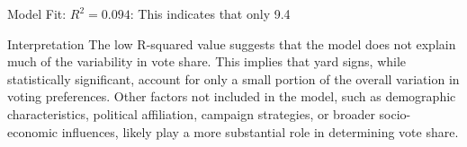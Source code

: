 \documentclass[12pt,letterpaper]{article}
\begin{document}
\begin{enumerate}
	Model Fit:	\( R^2 = 0.094 \): This indicates that only 9.4%
	
Interpretation The low R-squared value suggests that the model does not explain much of the variability in vote share. This implies that yard signs, while statistically significant, account for only a small portion of the overall variation in voting preferences. Other factors not included in the model, such as demographic characteristics, political affiliation, campaign strategies, or broader socio-economic influences, likely play a more substantial role in determining vote share.
	
\end{enumerate}  
\end{document}
